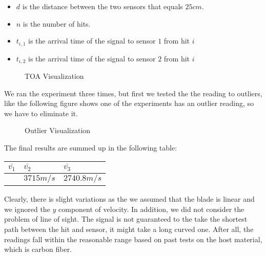 \begin{itemize}

\item
  {\(d\)} is the distance between the two sensors that equals
  {\(25cm\)}.
\item
  {\(n\)} is the number of hits.
\item
  {\(t_{i,1}\)} is the arrival time of the signal to sensor {\(1\)} from
  hit {\(i\)}
\item
  {\(t_{i,2}\)} is the arrival time of the signal to sensor {\(2\)} from
  hit {\(i\)}
\end{itemize}

    \begin{figure}[htbp]
        \centering
        \scalebox{0.5}{}
        \caption{TOA Visualization }
        \label{fig:label}
    \end{figure}

We ran the experiment three times, but first we tested the the reading
to outliers, like the following figure shows one of the experiments has
an outlier reading, so we have to eliminate it.

    \begin{figure}[htbp]
        \centering
        \scalebox{0.5}{}
        \caption{Outlier Visualization }
        \label{fig:label}
    \end{figure}

The final results are summed up in the following table:
\\

\begin{center}
	\begin{tabularx}{0.8\textwidth} { 
			| >{\centering\arraybackslash}X 
			| >{\centering\arraybackslash}X 
			| >{\centering\arraybackslash}X | }
		\hline
		$\bar{v_1}$ & $\bar{v_2}$& $\bar{v_3}$ \\
		\hline
		{\(4107.52m/s\)} & {\(3715m/s\)} & {\(2740.8m/s\)}  \\
		\hline
	\end{tabularx}
\end{center}

\vspace{5mm}

Clearly, there is slight variations as the we assumed that the blade is
linear and we ignored the {\(y\)} component of velocity. In addition, we
did not consider the problem of line of sight. The signal is not
guaranteed to the take the shortest path between the hit and sensor, it
might take a long curved one. After all, the readings fall within the
reasonable range based on past tests on the host material, which is
carbon fiber.


